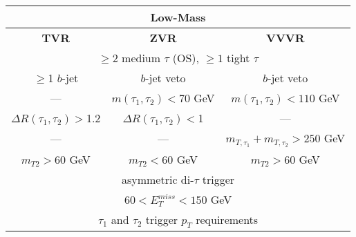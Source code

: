 %
\begin{tabular}{ccc}
\hline
\multicolumn{3}{c}{\textbf{Low-Mass}} \\ \hline \hline
\textbf{TVR} & \textbf{ZVR} & \textbf{VVVR} \\ \hline
\multicolumn{3}{c}{$\geq2$ medium $\tau$ (OS), $\geq1$ tight $\tau$} \\
\multicolumn{1}{c|}{$\geq$1 $b$-jet} & \multicolumn{1}{c|}{$b$-jet veto} & $b$-jet veto \\
\multicolumn{1}{c|}{---} & \multicolumn{1}{c|}{$m(\tau_1,\tau_2)<70$ GeV} & $m(\tau_1,\tau_2)<110$ GeV \\
\multicolumn{1}{c|}{$\Delta R(\tau_1,\tau_2)>$1.2} & \multicolumn{1}{c|}{$\Delta R(\tau_1,\tau_2)<$1} & --- \\
\multicolumn{1}{c|}{---} & \multicolumn{1}{c|}{---} & $m_{T,\tau_1}+m_{T,\tau_2}>250$ GeV \\
\multicolumn{1}{c|}{$m_{T2} > $60 GeV} & \multicolumn{1}{c|}{$m_{T2} < $60 GeV} & $m_{T2} > $60 GeV \\
\multicolumn{3}{c}{asymmetric di-$\tau$ trigger} \\
\multicolumn{3}{c}{$60<E_T^{miss}<150$ GeV} \\
\multicolumn{3}{c}{$\tau_1$ and $\tau_2$ trigger $p_T$  requirements} \\ \hline
\end{tabular}

%
%